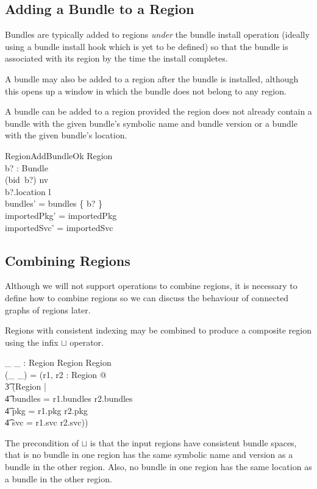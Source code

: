 \documentclass[a4paper,9pt]{article}
\begin{document}
\subsection{Adding a Bundle to a Region}

Bundles are typically added to regions \textit{under} the bundle install operation (ideally using a bundle install
hook which is yet to be defined) so that the bundle is associated with its region by the time the
install completes.

A bundle may also be added to a region after the bundle is installed, although this opens up a window in
which the bundle does not belong to any region.

A bundle can be added to a region provided the region does not already contain a bundle with
the given bundle's symbolic name and bundle version or a bundle with the given bundle's location.
\begin{schema}{RegionAddBundleOk}
  \Delta Region \\
  b? : Bundle \\
\where
  (bid~b?) \notin \dom nv \\
  b?.location \notin \dom l \\
  bundles' = bundles \cup \{ b? \} \\
  importedPkg' = importedPkg \\
  importedSvc' = importedSvc \\
\end{schema}

\subsection{Combining Regions}

Although we will not support operations to combine regions, it is necessary to define how to combine
regions so we can discuss the behaviour of connected graphs of regions later.

Regions with consistent indexing may be combined to produce a composite region using the infix $\sqcup$ operator.
\begin{axdef}
 \_ \sqcup \_ : Region \cross Region \pfun Region \\
\where
 (\_ \sqcup \_) = (\lambda r1, r2 : Region @ \\
\t3 (\mu Region | \\
\t4 bundles = r1.bundles \cup r2.bundles \land \\
\t4 pkg = r1.pkg \cup r2.pkg \land \\
\t4 svc = r1.svc \cup r2.svc)) \\
\end{axdef}
The precondition of $\sqcup$ is that the input regions have consistent bundle spaces, that is no bundle in one
region has the same symbolic name and version as a bundle in the other region.
Also, no bundle in one region has the same location as a bundle in the other region.
\end{document}
